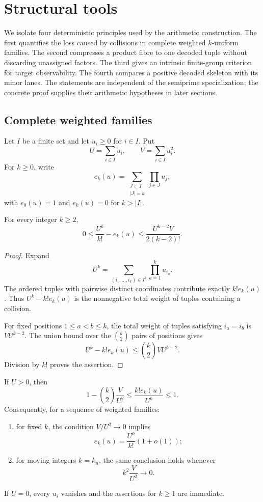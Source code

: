 \section{Structural tools}
\label{sec:structural-tools}

We isolate four deterministic principles used by the arithmetic construction.  The first quantifies the loss caused by collisions in complete weighted $k$-uniform families.  The second compresses a product fibre to one decoded tuple without discarding unassigned factors.  The third gives an intrinsic finite-group criterion for target observability.  The fourth compares a positive decoded skeleton with its minor lanes.  The statements are independent of the semiprime specialization; the concrete proof supplies their arithmetic hypotheses in later sections.

\subsection{Complete weighted families}

Let $I$ be a finite set and let $u_i\geq0$ for $i\in I$.  Put
\[
 U=\sum_{i\in I}u_i,
 \qquad
 V=\sum_{i\in I}u_i^2.
\]
For $k\geq0$, write
\[
 e_k(u)=\sum_{\substack{J\subset I\\ |J|=k}}\prod_{j\in J}u_j,
\]
with $e_0(u)=1$ and $e_k(u)=0$ for $k>|I|$.

\begin{theorem}
\label{thm:complete-family-collision}
For every integer $k\geq2$,
\[
 0\leq \frac{U^k}{k!}-e_k(u)
 \leq \frac{U^{k-2}V}{2(k-2)!}.
\]
\end{theorem}

\begin{proof}
Expand
\[
 U^k=\sum_{(i_1,\ldots,i_k)\in I^k}\prod_{a=1}^k u_{i_a}.
\]
The ordered tuples with pairwise distinct coordinates contribute exactly $k!e_k(u)$.  Thus $U^k-k!e_k(u)$ is the nonnegative total weight of tuples containing a collision.

For fixed positions $1\leq a<b\leq k$, the total weight of tuples satisfying $i_a=i_b$ is $VU^{k-2}$.  The union bound over the $\binom{k}{2}$ pairs of positions gives
\[
 U^k-k!e_k(u)
 \leq \binom{k}{2}VU^{k-2}.
\]
Division by $k!$ proves the assertion.
\end{proof}

\begin{corollary}
\label{cor:complete-family-relative}
If $U>0$, then
\[
 1-\binom{k}{2}\frac{V}{U^2}
 \leq \frac{k!e_k(u)}{U^k}
 \leq1.
\]
Consequently, for a sequence of weighted families:
\begin{enumerate}[label=(\roman*)]
\item for fixed $k$, the condition $V/U^2\to0$ implies
\[
 e_k(u)=\frac{U^k}{k!}(1+o(1));
\]
\item for moving integers $k=k_n$, the same conclusion holds whenever
\[
 k^2\frac{V}{U^2}\longrightarrow0.
\]
\end{enumerate}
If $U=0$, every $u_i$ vanishes and the assertions for $k\geq1$ are immediate.
\end{corollary}

